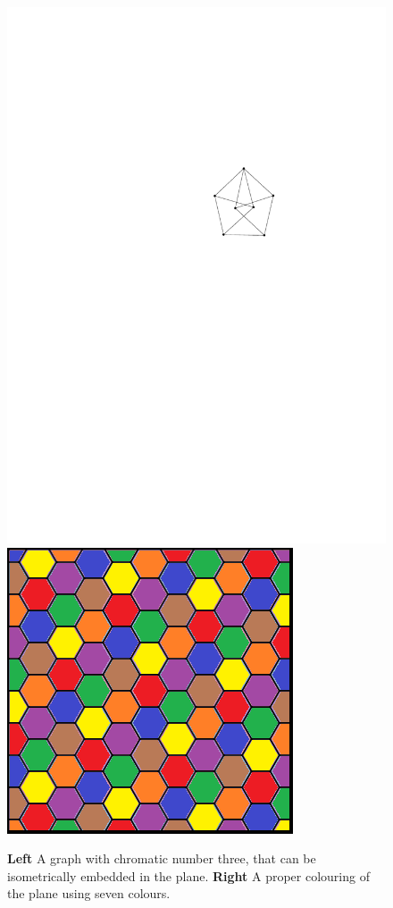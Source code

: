 \documentclass[kulak]{tplt}
\theoremstyle{definition}
\begin{document}
\begin{enumerate}
\begin{figure}[h]
\centering
\includegraphics[scale=0.7]{../imgs/plane_chromat}
\hspace{2cm}
\includegraphics[scale=0.3]{../imgs/plane_chromat7.png}
\caption{\textbf{Left} A graph with chromatic number three, that can be isometrically embedded in the plane. \textbf{Right} A proper colouring of the plane using seven colours.\label{fig:plane_chromat}}
\end{figure}



\end{enumerate}
\end{document}

